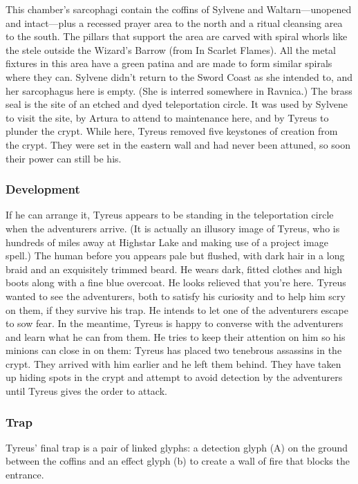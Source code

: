 \documentclass[10pt,a4paper,twoside,twocolumn,openany,bg=print,nodeprecatedcode]{dndbook}
\begin{document}
This chamber's sarcophagi contain the coffins of Sylvene and Waltarn—unopened and intact—plus a recessed prayer area to the north and a ritual cleansing area to the south. The pillars that support the area are carved with spiral whorls like the stele outside the Wizard's Barrow (from In Scarlet Flames). All the metal fixtures in this area have a green patina and are made to form similar spirals where they can.
Sylvene didn't return to the Sword Coast as she intended to, and her sarcophagus here is empty. (She is interred somewhere in Ravnica.)
The brass seal is the site of an etched and dyed teleportation circle. It was used by Sylvene to visit the site, by Artura to attend to maintenance here, and by Tyreus to plunder the crypt.
While here, Tyreus removed five keystones of creation from the crypt. They were set in the eastern wall and had never been attuned, so soon their power can still be his.
\subsubsection{Development}
If he can arrange it, Tyreus appears to be standing in the teleportation circle when the adventurers arrive. (It is actually an illusory image of Tyreus, who is hundreds of miles away at Highstar Lake and making use of a project image spell.)
The human before you appears pale but flushed, with dark hair in a long braid and an exquisitely trimmed beard. He wears dark, fitted clothes and high boots along with a fine blue overcoat. He looks relieved that you're here.
Tyreus wanted to see the adventurers, both to satisfy his curiosity and to help him scry on them, if they survive his trap. He intends to let one of the adventurers escape to sow fear.
In the meantime, Tyreus is happy to converse with the adventurers and learn what he can from them. He tries to keep their attention on him so his minions can close in on them: Tyreus has placed two tenebrous assassins in the crypt. They arrived with him earlier and he left them behind. They have taken up hiding spots in the crypt and attempt to avoid detection by the adventurers until Tyreus gives the order to attack.
\subsubsection{Trap}
Tyreus' final trap is a pair of linked glyphs: a detection glyph (A) on the ground between the coffins and an effect glyph (b) to create a wall of fire that blocks the entrance.
\end{document}
